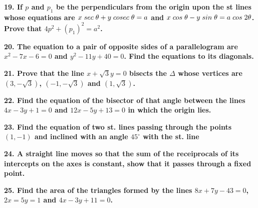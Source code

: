 \documentclass{article}
\begin{document}
\begin{flushleft}
\vspace{0.2cm}
\textbf{19. If $p$ and $p_1$ be the perpendiculars from the origin upon the st lines whose equations are $x\hspace{0.1cm} sec\hspace{0.1cm}\theta+y \hspace{0.1cm}cosec\hspace{0.1cm} \theta = a$ and $x\hspace{0.1cm} cos\hspace{0.1cm}\theta - y \hspace{0.1cm}sin \hspace{0.1cm}\theta = a \hspace{0.1cm}cos\hspace{0.1cm} 2\theta $. Prove that $4p^2 + (p_1)^2 = a^2$.}\par
\vspace{0.2cm}
\textbf{20. The equation to a pair of opposite sides of a parallelogram are $x^2 -7x -6 = 0$ and $y^2 -11y  +40 =0$. Find the equations to its diagonals.}\par
\newpage
\textbf{21. Prove that the line $x+\sqrt{3}y = 0$ bisects the $\Delta$ whose vertices are $(3,-\sqrt{3})$, $(-1,-\sqrt{3})$ and $(1,\sqrt{3})$.}\par
\vspace{0.2cm}
\textbf{22. Find the equation of the bisector of that angle between the lines $4x-3y+1 =0 $ and $12x - 5y +13 =0 $ in which the origin lies. }\par
\vspace{0.2cm}
\textbf{23. Find the equation of two st. lines passing through the points $(1,-1)$ and inclined with an angle $45^\circ$ with the st. line }\par
\vspace{0.2cm}
\textbf{24. A straight line moves so that the sum of the receiprocals of its intercepts on the axes is constant, show that it passes through a fixed point.}\par
\vspace{0.2cm}
\textbf{25. Find the area of the triangles formed by the lines $8x+7y-43=0$, $2x=5y = 1$ and $4x-3y+11 = 0$.}\par


\end{flushleft}
\end{document}
